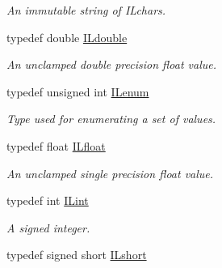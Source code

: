 \begin{DoxyCompactItemize}
\begin{DoxyCompactList}\small\item\em An immutable string of {\itshape I\+Lchars}. \end{DoxyCompactList}\item 
\hypertarget{group__il__types_ga3896ba656038eb34345347cd095b020a}{typedef double \hyperlink{group__il__types_ga3896ba656038eb34345347cd095b020a}{I\+Ldouble}}\label{group__il__types_ga3896ba656038eb34345347cd095b020a}

\begin{DoxyCompactList}\small\item\em An unclamped double precision float value. \end{DoxyCompactList}\item 
\hypertarget{group__il__types_ga62ca73445716183ef42b1f3906a45ed0}{typedef unsigned int \hyperlink{group__il__types_ga62ca73445716183ef42b1f3906a45ed0}{I\+Lenum}}\label{group__il__types_ga62ca73445716183ef42b1f3906a45ed0}

\begin{DoxyCompactList}\small\item\em Type used for enumerating a set of values. \end{DoxyCompactList}\item 
\hypertarget{group__il__types_ga376156c9461893f4b1a5de9579dc86f2}{typedef float \hyperlink{group__il__types_ga376156c9461893f4b1a5de9579dc86f2}{I\+Lfloat}}\label{group__il__types_ga376156c9461893f4b1a5de9579dc86f2}

\begin{DoxyCompactList}\small\item\em An unclamped single precision float value. \end{DoxyCompactList}\item 
\hypertarget{group__il__types_ga8effe51a00daaa0878631e5af75a36cb}{typedef int \hyperlink{group__il__types_ga8effe51a00daaa0878631e5af75a36cb}{I\+Lint}}\label{group__il__types_ga8effe51a00daaa0878631e5af75a36cb}

\begin{DoxyCompactList}\small\item\em A signed integer. \end{DoxyCompactList}\item 
\hypertarget{group__il__types_gaecbb74c86cc28ee190923c1b167a50fc}{typedef signed short \hyperlink{group__il__types_gaecbb74c86cc28ee190923c1b167a50fc}{I\+Lshort}}\label{group__il__types_gaecbb74c86cc28ee190923c1b167a50fc}


\end{DoxyCompactItemize}
